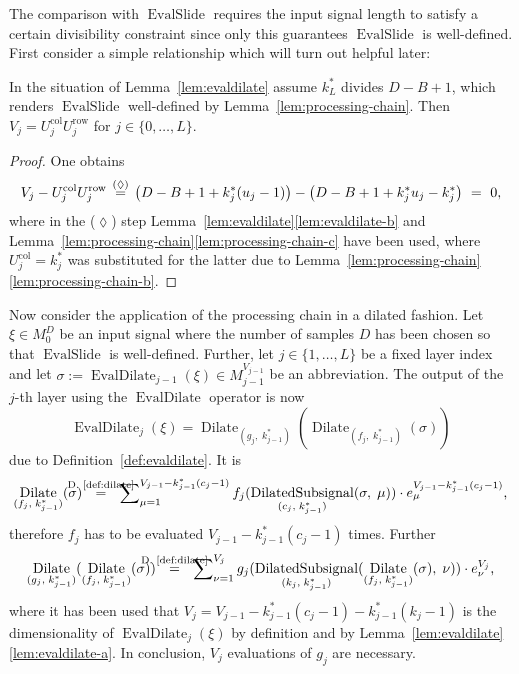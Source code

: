 \documentclass[journal]{IEEEtran}
\newcommand{\ROI}{B}
\newcommand{\discint}[2]{\{#1,\dotsc,#2\}}
\newcommand{\inint}[2]{\in\discint{#1}{#2}}
\DeclareMathOperator{\EvalSlide}{EvalSlide}
\newcommand{\row}{\operatorname{row}}
\newcommand{\col}{\operatorname{col}}
\newcommand{\equsing}[1]{\overset{\mathclap{\text{#1}}}{=}}
\DeclareMathOperator{\DilatedSubsignal}{DilatedSubsignal}
\DeclareMathOperator{\Dilate}{Dilate}
\DeclareMathOperator{\EvalDilate}{EvalDilate}
\begin{document}
The comparison with $\EvalSlide$ requires the input signal length to satisfy a certain divisibility constraint since only this guarantees $\EvalSlide$ is well-defined.
First consider a simple relationship which will turn out helpful later:
\begin{remark}
\label{rem:evaldilate-complexity}
In the situation of Lemma~\ref{lem:evaldilate} assume $k_L^*$ divides $D - \ROI + 1$, which renders $\EvalSlide$ well-defined by Lemma~\ref{lem:processing-chain}.
Then $V_j = U_j^{\col}U_j^{\row}$ for $j\inint{0}{L}$.
\end{remark}\begin{proof}
One obtains
\begin{displaymath}
  V_j - U_j^{\col}U_j^{\row}
  \ \equsing{($\lozenge$)}\ \left(D - \ROI + 1 + k_j^*(u_j - 1)\right) - \left(D - \ROI + 1 + k_j^*u_j - k_j^*\right)
  \ =\ 0\text{,}
\end{displaymath}
where in the ($\lozenge$) step Lemma~\ref{lem:evaldilate}\ref{lem:evaldilate-b} and Lemma~\ref{lem:processing-chain}\ref{lem:processing-chain-c} have been used, where $U_j^{\col} = k_j^*$ was substituted for the latter due to Lemma~\ref{lem:processing-chain}\ref{lem:processing-chain-b}.
\end{proof}

Now consider the application of the processing chain in a dilated fashion.
Let $\xi\in M_0^D$ be an input signal where the number of samples $D$ has been chosen so that $\EvalSlide$ is well-defined.
Further, let $j\inint{1}{L}$ be a fixed layer index and let $\sigma := \EvalDilate_{j - 1}(\xi)\in M_{j - 1}^{V_{j - 1}}$ be an abbreviation.
The output of the $j$-th layer using the $\EvalDilate$ operator is now
\begin{displaymath}
  \EvalDilate_j(\xi) = \Dilate_{(g_j,\; k_{j - 1}^*)}( \Dilate_{(f_j,\; k_{j - 1}^*)}( \sigma ) )
\end{displaymath}
due to Definition~\ref{def:evaldilate}.
It is
\begin{displaymath}
  \Dilate_{(f_j,\; k_{j - 1}^*)}( \sigma )
  \ \ \equsing{D.~\ref{def:dilate}}\ \ \sum\nolimits_{\mu = 1}^{V_{j - 1} - k_{j - 1}^*(c_j - 1)} f_j(\DilatedSubsignal_{(c_j,\;k_{j - 1}^*)}(\sigma,\;\mu))\cdot e_\mu^{V_{j - 1} - k_{j - 1}^*(c_j - 1)}\text{,}
\end{displaymath}
therefore $f_j$ has to be evaluated $V_{j - 1} - k_{j - 1}^*(c_j - 1)$ times.
Further
\begin{displaymath}
  \Dilate_{(g_j,\; k_{j - 1}^*)}( \Dilate_{(f_j,\; k_{j - 1}^*)}( \sigma ) )
  \ \ \equsing{D.~\ref{def:dilate}}\ \ \sum\nolimits_{\nu = 1}^{V_j} g_j(\DilatedSubsignal_{(k_j,\;k_{j - 1}^*)}(\Dilate_{(f_j,\; k_{j - 1}^*)}( \sigma ),\;\nu))\cdot e_\nu^{V_j}\text{,}
\end{displaymath}
where it has been used that $V_j = V_{j - 1} - k_{j - 1}^*(c_j - 1) - k_{j - 1}^*(k_j - 1)$ is the dimensionality of $\EvalDilate_j(\xi)$ by definition and by Lemma~\ref{lem:evaldilate}\ref{lem:evaldilate-a}.
In conclusion, $V_j$ evaluations of $g_j$ are necessary.
\end{document}
